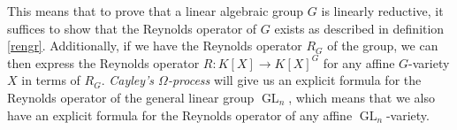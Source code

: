 This means that to prove that a linear algebraic group $G$ is linearly reductive, it suffices to show that the Reynolds operator of $G$ exists as described in definition \ref{rengr}.
Additionally, if we have the Reynolds operator $R_G$ of the group, we can then express the Reynolds operator $R \colon K[X] \rightarrow K[X]^G$ for any affine $G$-variety $X$ in terms of $R_G$.
\textit{Cayley's $\Omega$-process} will give us an explicit formula for the Reynolds operator of the general linear group $\operatorname{GL}_n$, which means that we also have an explicit formula for the Reynolds operator of any affine $\operatorname{GL}_n$-variety.
